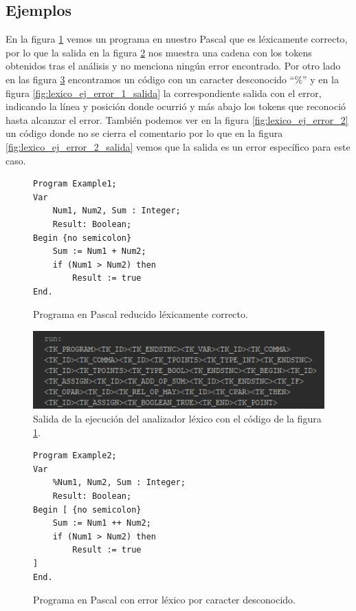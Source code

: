 \subsection{Ejemplos}
En la figura \ref{fig:lexico_ej_correcto} vemos un programa en nuestro Pascal que es léxicamente correcto, por lo que la salida en la figura \ref{fig:lexico_ej_correcto_salida} nos muestra una cadena con los tokens obtenidos tras el análisis y no menciona ningún error encontrado. Por otro lado en las figura \ref{fig:lexico_ej_error_1} encontramos un código con un caracter desconocido ``$\%$'' y en la figura \ref{fig:lexico_ej_error_1_salida} la correspondiente salida con el error, indicando la línea y posición donde ocurrió y más abajo los tokens que reconoció hasta alcanzar el error. También podemos ver en la figura \ref{fig:lexico_ej_error_2} un código donde no se cierra el comentario por lo que en la figura \ref{fig:lexico_ej_error_2_salida} vemos que la salida es un error específico para este caso.

\begin{figure}[H]
\begin{verbatim}
Program Example1;
Var       
    Num1, Num2, Sum : Integer;
    Result: Boolean;
Begin {no semicolon}
    Sum := Num1 + Num2;
    if (Num1 > Num2) then
        Result := true
End.
\end{verbatim}
\caption{Programa en Pascal reducido léxicamente correcto.}
\label{fig:lexico_ej_correcto}
\end{figure}

\begin{figure}[H]
\centering
\includegraphics[scale=1]{img/lexico/salida_lexico_ej_correcto.png}
\caption{Salida de la ejecución del analizador léxico con el código de la figura \ref{fig:lexico_ej_correcto}.}
\label{fig:lexico_ej_correcto_salida}
\end{figure}

\begin{figure}[H]
\begin{verbatim}
Program Example2;
Var       
    %Num1, Num2, Sum : Integer;
    Result: Boolean;
Begin [ {no semicolon}
    Sum := Num1 ++ Num2;
    if (Num1 > Num2) then
        Result := true
]
End.
\end{verbatim}
\caption{Programa en Pascal con error léxico por caracter desconocido.}
\label{fig:lexico_ej_error_1}
\end{figure}

